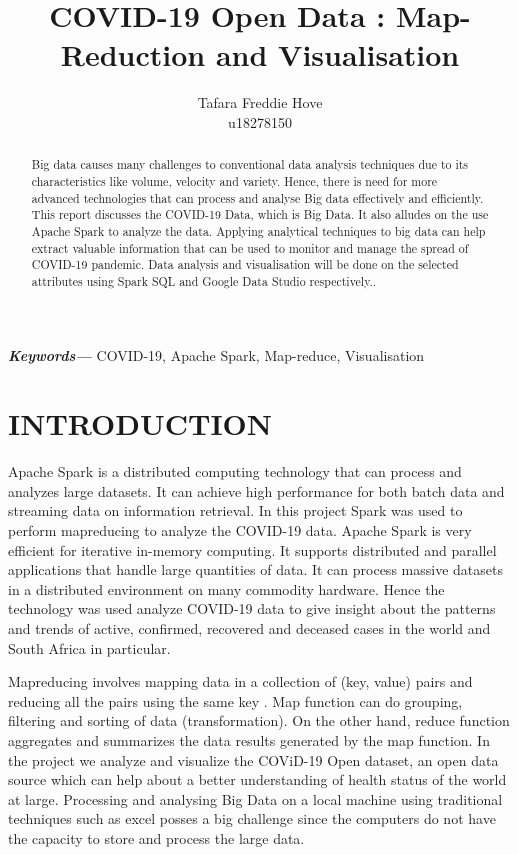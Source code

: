 \documentclass[12pt]{article}
\title{COVID-19 Open Data : Map-Reduction and Visualisation}
\author{Tafara Freddie Hove \\
        \small u18278150 \\
}
\date{}
\providecommand{\keywords}[1]
{
  \small	
  \textbf{\textit{Keywords---}} #1 
}
\begin{document}
\maketitle
\begin{abstract}


Big data  causes many challenges to conventional data analysis techniques due to its characteristics like volume, velocity and variety. Hence, there is need for more advanced technologies that can process and analyse Big data  effectively and efficiently. This report discusses the COVID-19 Data, which is Big Data. It also alludes on the use Apache Spark to analyze the data. Applying analytical techniques to big data can help extract valuable information that can be used to monitor and manage the spread of COVID-19  pandemic. Data analysis and visualisation will be done on the selected attributes using Spark SQL and Google Data Studio respectively..

\end{abstract}\hspace{10pt}
\keywords{COVID-19, Apache Spark, Map-reduce, Visualisation}

\section{INTRODUCTION}

Apache Spark is a distributed computing  technology that can  process and analyzes large datasets. It can achieve high performance  for both batch data and streaming data on information retrieval. In this project Spark was used to perform mapreducing to analyze the COVID-19 data.  Apache Spark is very efficient for iterative in-memory computing. It supports distributed and parallel applications that handle large quantities of data. It can process massive datasets in a distributed environment on many commodity hardware. Hence the technology was  used analyze COVID-19 data to give insight about the patterns and trends of active, confirmed, recovered and deceased cases in the world and South Africa in particular.

 Mapreducing involves mapping  data in a collection of (key, value) pairs and reducing all the pairs using the same key \cite{Johnson et al}.  Map function can do grouping, filtering and sorting of data (transformation). On the other hand, reduce function aggregates and summarizes the data results generated by the map function. In the project we analyze and visualize the COViD-19 Open dataset, an open data source which can help about a better understanding of health status of the world at large. Processing and analysing Big Data on a local machine using traditional techniques such as excel posses a big challenge since the computers do not have the capacity to store and process the large data.
 
\end{document}
